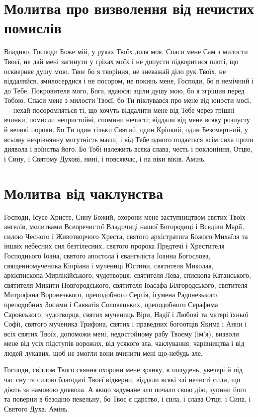 \documentclass[chapters.tex]{subfiles}
\begin{document}
\section{Молитва про визволення від нечистих помислів}
Владико, Господи Боже мій, у руках Твоїх доля моя. Спаси мене Сам з милости Твоєї, не дай мені загинути у гріхах моїх і не допусти підкоритися плоті, що оскверняє душу мою. Твоє бо я творіння, не зневажай діло рук Твоїх, не віддаляйся, змилосердися і не посором, не покинь мене, Господи, бо я немічний і до Тебе, Покровителя мого, Бога, вдаюся: зціли душу мою, бо я згрішив перед Тобою. Спаси мене з милости Твоєї, бо Ти піклувався про мене від юности моєї, — нехай посоромляться ті, що хочуть віддалити мене від Тебе через грішні вчинки, помисли непристойні, спомини нечисті; віддали від мене всяку розпусту й великі пороки. Бо Ти один тільки Святий, один Кріпкий, один Безсмертний, у всьому незрівнянну могутність маєш, і від Тебе одного подається всім сила проти диявола і воїнства його. Бо Тобі належить всяка слава, честь і поклоніння, Отцю, і Сину, і Святому Духові, нині, і повсякчас, і на віки віків. Амінь.

\section{Молитва від чаклунства}
Господи, Ісусе Христе, Сину Божий, охорони мене заступництвом святих Твоїх ангелів, молитвами Всепречистої Владичиці нашої Богородиці і Вседіви Марії, силою Чесного і Животворчого Хреста, святого архістратига Божого Михаїла та інших небесних сил безтілесних, святого пророка Предтечі і Хрестителя Господнього Іоана, святого апостола і євангеліста Іоанна Богослова, священномученика Кіпріана і мучениці Юстини, святителя Миколая, архієпископа Мирлікійського, чудотворця, святителя Лева, єпископа Катанського, святителя Микити Новгородського, святителя Іоасафа Білгородського, святителя Митрофана Воронезького, преподобного Сергія, ігумена Радонезького, преподобних Зосими і Савватія Соловецьких, преподобного Серафима Саровського, чудотворця, святих мучениць Віри, Надії і Любові та матері їхньої Софії, святого мученика Трифона, святих і праведних богоотців Якима і Анни і всіх святих Твоїх, допоможи мені, недостойному рабу Твоєму (ім’я), визволи мене від усіх підступів ворожих, від усякого зла, чаклування, чарівництва і від людей лукавих, щоб не змогли вони вчинити мені що-небудь зле.

Господи, світлом Твого сяяння охорони мене зранку, в полудень, увечері й під час сну та силою благодаті Твоєї відверни, віддали всякі злі нечисті сили, що діють за намовою диявола. А якщо задумане зло почало свою дію, зупини його та поверни в безодню пекельну, бо Твоє є царство, і сила, і слава Отця, і Сина, і Святого Духа. Амінь.
\end{document}
